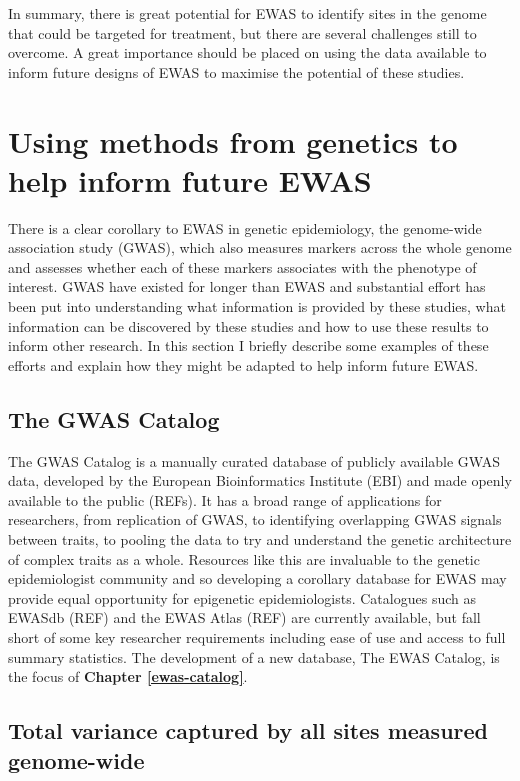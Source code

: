 \documentclass[11pt,twoside]{bristolthesis}
\begin{document}
In summary, there is great potential for EWAS to identify sites in the genome that could be targeted for treatment, but there are several challenges still to overcome. A great importance should be placed on using the data available to inform future designs of EWAS to maximise the potential of these studies.

\hypertarget{genetics-in-ewas}{%
\section{Using methods from genetics to help inform future EWAS}\label{genetics-in-ewas}}

There is a clear corollary to EWAS in genetic epidemiology, the genome-wide association study (GWAS), which also measures markers across the whole genome and assesses whether each of these markers associates with the phenotype of interest. GWAS have existed for longer than EWAS and substantial effort has been put into understanding what information is provided by these studies, what information can be discovered by these studies and how to use these results to inform other research. In this section I briefly describe some examples of these efforts and explain how they might be adapted to help inform future EWAS.

\hypertarget{gwas-catalog}{%
\subsection{The GWAS Catalog}\label{gwas-catalog}}

The GWAS Catalog is a manually curated database of publicly available GWAS data, developed by the European Bioinformatics Institute (EBI) and made openly available to the public (REFs). It has a broad range of applications for researchers, from replication of GWAS, to identifying overlapping GWAS signals between traits, to pooling the data to try and understand the genetic architecture of complex traits as a whole. Resources like this are invaluable to the genetic epidemiologist community and so developing a corollary database for EWAS may provide equal opportunity for epigenetic epidemiologists. Catalogues such as EWASdb (REF) and the EWAS Atlas (REF) are currently available, but fall short of some key researcher requirements including ease of use and access to full summary statistics. The development of a new database, The EWAS Catalog, is the focus of \textbf{Chapter \ref{ewas-catalog}}.

\hypertarget{heritability}{%
\subsection{Total variance captured by all sites measured genome-wide}\label{heritability}}
\end{document}
